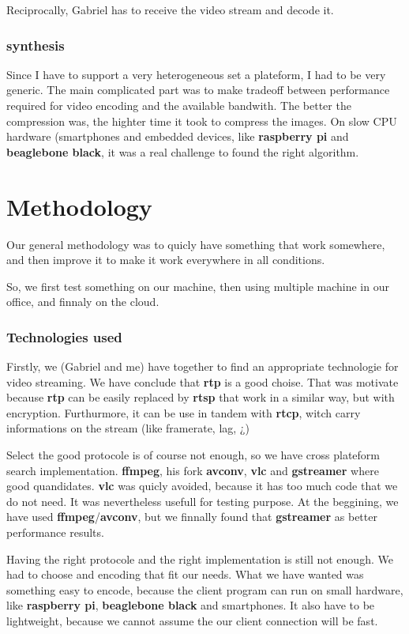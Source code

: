 \documentclass[a4paper,11pt]{custom}
\newcommand{\rtp}{\textbf{rtp}}
\newcommand{\rtcp}{\textbf{rtcp}}
\newcommand{\rtsp}{\textbf{rtsp}}
\newcommand{\vlc}{\textbf{vlc}}
\newcommand{\avconv}{\textbf{avconv}}
\newcommand{\ffmpeg}{\textbf{ffmpeg}}
\newcommand{\gstreamer}{\textbf{gstreamer}}
\newcommand{\rpi}{\textbf{raspberry pi}}
\newcommand{\bbb}{\textbf{beaglebone black}}
\begin{document}
Reciprocally, Gabriel has to receive the video stream and decode it.

\subsection{synthesis}

Since I have to support a very heterogeneous set a plateform, I had to be very
generic.
The main complicated part was to make tradeoff between performance required for
video encoding and the available bandwith. The better the compression was, the
highter time it took to compress the images. 
On slow CPU hardware (smartphones and embedded devices, like \rpi{} and \bbb{},
it was a real challenge to found the right algorithm.

\chapter{Methodology}

Our general methodology was to quicly have something that work somewhere, and
then improve it to make it work everywhere in all conditions.

So, we first test something on our machine, then using multiple machine in our
office, and finnaly on the cloud.

\subsection{Technologies used}

Firstly, we (Gabriel and me) have together to find an appropriate technologie
for video streaming. We have conclude that \rtp{} is a good choise. That was
motivate because \rtp{} can be easily replaced by \rtsp{} that work in a similar
way, but with encryption. Furthurmore, it can be use in tandem with \rtcp, witch
carry informations on the stream (like framerate, lag, ¿)

Select the good protocole is of course not enough, so we have cross plateform
search implementation. \ffmpeg, his fork \avconv, \vlc{} and \gstreamer{} where good
quandidates. \vlc{} was quicly avoided, because it has too much code that we do not
need. It was nevertheless usefull for testing purpose. At the beggining, we have
used \ffmpeg/\avconv, but we finnally found that \gstreamer{} as better performance
results.

Having the right protocole and the right implementation is still not enough. We
had to choose and encoding that fit our needs. What we have wanted was something
easy to encode, because the client program can run on small hardware, like \rpi,
\bbb{} and smartphones. It also have to be lightweight, because we cannot assume
the our client connection will be fast.
\end{document}
